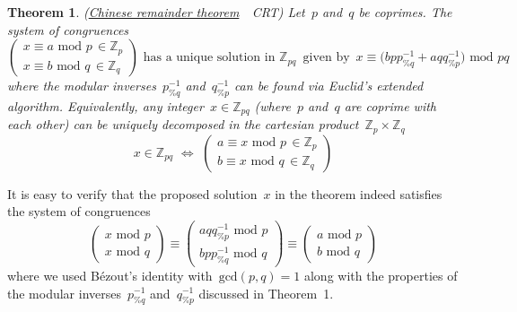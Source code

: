 \documentclass{article}
\newtheorem{theorem}{Theorem}
\begin{document}
\begin{theorem}
(\href{https://en.wikipedia.org/wiki/Chinese_remainder_theorem}{\hypertarget{theorem5}{Chinese remainder theorem}}~\textemdash~CRT) Let~$p$ and~$q$ be coprimes.  The system of congruences
\begin{equation*}
\begin{pmatrix}
x \equiv a \,\,\text{mod}\,\, p \, \in \mathbb{Z}_p \\
x \equiv b \,\,\text{mod}\,\, q \, \in \mathbb{Z}_q
\end{pmatrix} \,\, \text{has a unique solution in } \mathbb{Z}_{pq} \,\,\, \text{given by} \,\,\, x \equiv \big( b p p^{-1}_{\%q} + a q q^{-1}_{\%p} \big) \,\,\text{mod}\,\,pq
\end{equation*}
where the modular inverses~$p^{-1}_{\%q}$ and~$q^{-1}_{\%p}$ can be found via Euclid's extended algorithm.  Equivalently, any integer~$x \in \mathbb{Z}_{pq}$ (where~$p$ and~$q$ are coprime with each other) can be uniquely decomposed in the cartesian product~$\mathbb{Z}_p \times \mathbb{Z}_q$
\begin{equation*}
x \in \mathbb{Z}_{pq} \,\, \Longleftrightarrow \,\, 
\begin{pmatrix}
a \equiv x \,\,\text{mod}\,\, p \, \in \mathbb{Z}_p \\
b \equiv x \,\,\text{mod}\,\, q \, \in \mathbb{Z}_q
\end{pmatrix}
\end{equation*}
\end{theorem}

\noindent It is easy to verify that the proposed solution~$x$ in the theorem indeed satisfies the system of congruences
\begin{equation*}
\begin{pmatrix}
x \,\,\text{mod}\,\, p  \\[0.3em]
x \,\,\text{mod}\,\, q
\end{pmatrix}
\equiv
\begin{pmatrix}
a q q^{-1}_{\%p} \,\,\text{mod}\,\,p \\[0.3em]
b p p^{-1}_{\%q} \,\,\text{mod}\,\,q
\end{pmatrix}
\equiv
\begin{pmatrix}
a \,\,\text{mod}\,\,p \\[0.3em]
b \,\,\text{mod}\,\,q
\end{pmatrix}
\end{equation*}
where we used B\'ezout's identity with~$\text{gcd}(p, q)=1$ along with the properties of the modular inverses~$p^{-1}_{\%q}$ and~$q^{-1}_{\%p}$ discussed in Theorem~1.
\end{document}
